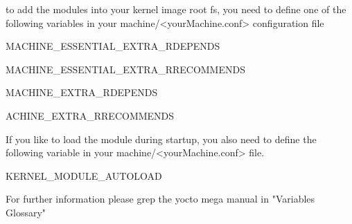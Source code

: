 


to add the modules into your kernel image root fs, you need to define one of the
following variables in your machine/<yourMachine.conf> configuration file

MACHINE_ESSENTIAL_EXTRA_RDEPENDS

MACHINE_ESSENTIAL_EXTRA_RRECOMMENDS

MACHINE_EXTRA_RDEPENDS

ACHINE_EXTRA_RRECOMMENDS 


If you like to load the module during startup, you also need to define the
following variable in your machine/<yourMachine.conf> file.

KERNEL_MODULE_AUTOLOAD 

For further information please grep the yocto mega manual in "Variables Glossary"

